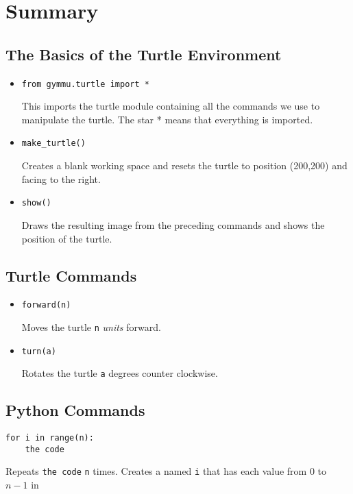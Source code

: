 \documentclass[11pt,a4paper]{report}
\begin{document}
\section{Summary}


\subsection{The Basics of the Turtle Environment}

\begin{itemize}
\item \begin{lstlisting}
from gymmu.turtle import *
\end{lstlisting}

This imports the turtle \gls{module} containing all the commands we use to manipulate the turtle. The star * means that everything is imported.

\item \begin{lstlisting}
make_turtle()
\end{lstlisting}

Creates a blank working space and resets the turtle to position (200,200) and facing to the right.



\item \begin{lstlisting}
show()
\end{lstlisting}

Draws the resulting image from the preceding commands and shows the position of the turtle.

\end{itemize}


\subsection{Turtle Commands}

\begin{itemize}
\item \begin{lstlisting}
forward(n)
\end{lstlisting}

Moves the turtle \texttt{n} \emph{units} forward.

\item \begin{lstlisting}
turn(a)
\end{lstlisting}

Rotates the turtle \texttt{a} degrees counter clockwise.

\end{itemize}

\subsection{Python Commands}

\item \begin{lstlisting}
for i in range(n):
	the code
\end{lstlisting}

Repeats \texttt{the code} \texttt{n} times. Creates a  named \texttt{i} that has each value from $0$ to $n-1$ in 



\printglossary
\end{document}

